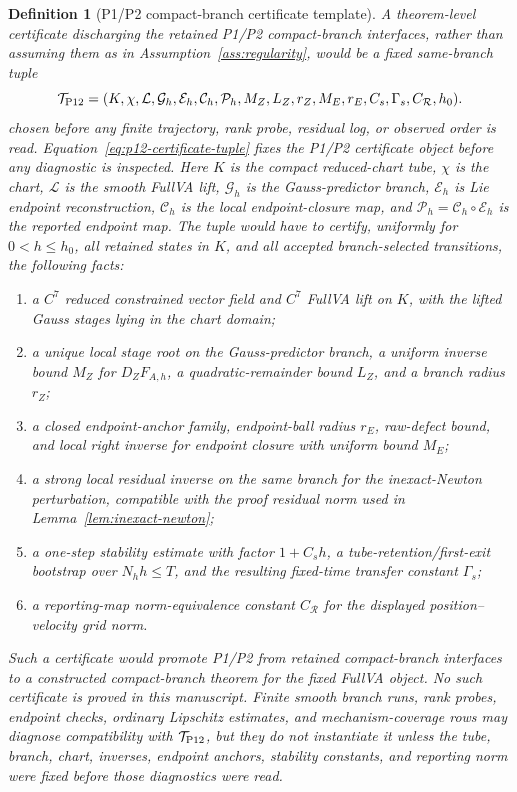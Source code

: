 \documentclass[preprint,12pt]{elsarticle}
\newtheorem{definition}{Definition}
\begin{document}
\begin{definition}[P1/P2 compact-branch certificate template]
\label{def:p1p2-compact-branch-certificate-template}
A theorem-level certificate discharging the retained P1/P2 compact-branch
interfaces, rather than assuming them as in
Assumption~\ref{ass:regularity}, would be a fixed same-branch tuple
\begin{equation}
\label{eq:p12-certificate-tuple}
  \mathcal T_{\rm P12}
  =(K,\chi,\mathcal L,\mathcal G_h,\mathcal E_h,\mathcal C_h,
    \mathcal P_h,M_Z,L_Z,r_Z,M_E,r_E,C_s,\Gamma_s,C_{\mathcal R},h_0).
\end{equation}
chosen before any finite trajectory, rank probe, residual log, or observed
order is read.  Equation~\eqref{eq:p12-certificate-tuple} fixes the P1/P2
certificate object before any diagnostic is inspected.  Here \(K\) is the
compact reduced-chart tube, \(\chi\) is
the chart, \(\mathcal L\) is the smooth FullVA lift, \(\mathcal G_h\) is the
Gauss-predictor branch, \(\mathcal E_h\) is Lie endpoint reconstruction,
\(\mathcal C_h\) is the local endpoint-closure map, and
\(\mathcal P_h=\mathcal C_h\circ\mathcal E_h\) is the reported endpoint map.
The tuple would have to certify, uniformly for \(0<h\le h_0\), all retained
states in \(K\), and all accepted branch-selected transitions, the following
facts:
\begin{enumerate}
  \item a \(C^7\) reduced constrained vector field and \(C^7\) FullVA lift on
  \(K\), with the lifted Gauss stages lying in the chart domain;
  \item a unique local stage root on the Gauss-predictor branch, a uniform
  inverse bound \(M_Z\) for \(D_ZF_{A,h}\), a quadratic-remainder bound
  \(L_Z\), and a branch radius \(r_Z\);
  \item a closed endpoint-anchor family, endpoint-ball radius \(r_E\),
  raw-defect bound, and local right inverse for endpoint closure with
  uniform bound \(M_E\);
  \item a strong local residual inverse on the same branch for the
  inexact-Newton perturbation, compatible with the proof residual norm used
  in Lemma~\ref{lem:inexact-newton};
  \item a one-step stability estimate with factor \(1+C_s h\), a
  tube-retention/first-exit bootstrap over \(N_hh\le T\), and the resulting
  fixed-time transfer constant \(\Gamma_s\);
  \item a reporting-map norm-equivalence constant \(C_{\mathcal R}\) for the
  displayed position--velocity grid norm.
\end{enumerate}
Such a certificate would promote P1/P2 from retained compact-branch
interfaces to a constructed compact-branch theorem for the fixed FullVA
object.  No such certificate is proved in this manuscript.  Finite smooth
branch runs, rank probes, endpoint checks, ordinary Lipschitz estimates,
and mechanism-coverage rows may diagnose compatibility with
\(\mathcal T_{\rm P12}\), but they do not instantiate it unless the tube,
branch, chart, inverses, endpoint anchors, stability constants, and reporting
norm were fixed before those diagnostics were read.
\end{definition}
\end{document}
